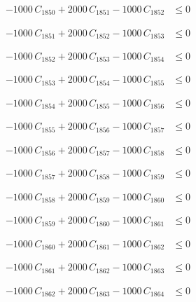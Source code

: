 \documentclass[a4paper,11pt]{article}
\begin{document}
\begin{align}
-1000\,C_{1850} + 2000\,C_{1851} - 1000\,C_{1852} &\leq 0 \nonumber
\end{align}

\begin{align}
-1000\,C_{1851} + 2000\,C_{1852} - 1000\,C_{1853} &\leq 0 \nonumber
\end{align}

\begin{align}
-1000\,C_{1852} + 2000\,C_{1853} - 1000\,C_{1854} &\leq 0 \nonumber
\end{align}

\begin{align}
-1000\,C_{1853} + 2000\,C_{1854} - 1000\,C_{1855} &\leq 0 \nonumber
\end{align}

\begin{align}
-1000\,C_{1854} + 2000\,C_{1855} - 1000\,C_{1856} &\leq 0 \nonumber
\end{align}

\begin{align}
-1000\,C_{1855} + 2000\,C_{1856} - 1000\,C_{1857} &\leq 0 \nonumber
\end{align}

\begin{align}
-1000\,C_{1856} + 2000\,C_{1857} - 1000\,C_{1858} &\leq 0 \nonumber
\end{align}

\begin{align}
-1000\,C_{1857} + 2000\,C_{1858} - 1000\,C_{1859} &\leq 0 \nonumber
\end{align}

\begin{align}
-1000\,C_{1858} + 2000\,C_{1859} - 1000\,C_{1860} &\leq 0 \nonumber
\end{align}

\begin{align}
-1000\,C_{1859} + 2000\,C_{1860} - 1000\,C_{1861} &\leq 0 \nonumber
\end{align}

\begin{align}
-1000\,C_{1860} + 2000\,C_{1861} - 1000\,C_{1862} &\leq 0 \nonumber
\end{align}

\begin{align}
-1000\,C_{1861} + 2000\,C_{1862} - 1000\,C_{1863} &\leq 0 \nonumber
\end{align}

\begin{align}
-1000\,C_{1862} + 2000\,C_{1863} - 1000\,C_{1864} &\leq 0 \nonumber
\end{align}
\end{document}
